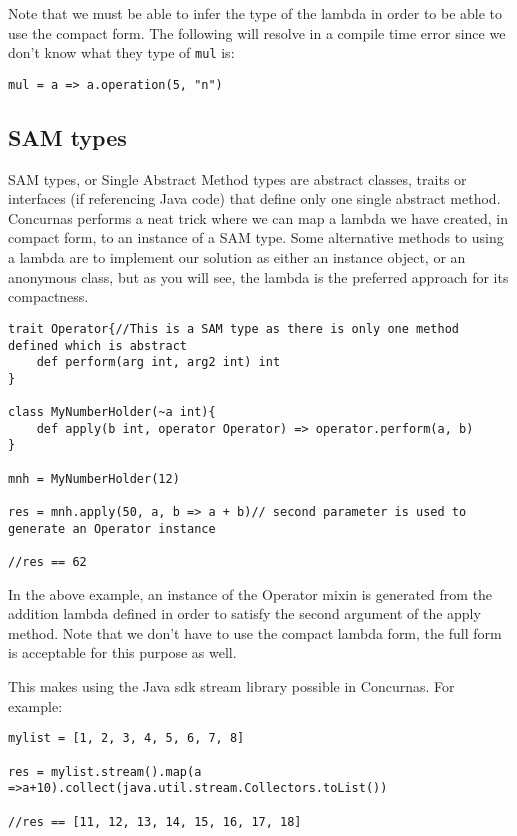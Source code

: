 \documentclass[conc-doc]{subfiles}
\begin{document}
Note that we must be able to infer the type of the lambda in order to be able to use the compact form. The following will resolve in a compile time error since we don't know what they type of \lstinline{mul} is:
\begin{lstlisting}
mul = a => a.operation(5, "n")
\end{lstlisting}

\subsection{SAM types}
\label{ss:samTypes}
SAM types, or Single Abstract Method types are abstract classes, traits or interfaces (if referencing Java code) that define only one single abstract method. Concurnas performs a neat trick where we can map a lambda we have created, in compact form, to an instance of a SAM type. Some alternative methods to using a lambda are to implement our solution as either an instance object, or an anonymous class, but as you will see, the lambda is the preferred approach for its compactness.

\begin{lstlisting}
trait Operator{//This is a SAM type as there is only one method defined which is abstract 
	def perform(arg int, arg2 int) int
}

class MyNumberHolder(~a int){
	def apply(b int, operator Operator) => operator.perform(a, b)
}

mnh = MyNumberHolder(12)

res = mnh.apply(50, a, b => a + b)// second parameter is used to generate an Operator instance

//res == 62
\end{lstlisting}

In the above example, an instance of the Operator mixin is generated from the addition lambda defined in order to satisfy the second argument of the apply method. Note that we don't have to use the compact lambda form, the full form is acceptable for this purpose as well.

This makes using the Java sdk stream library possible in Concurnas. For example:

\begin{lstlisting}
mylist = [1, 2, 3, 4, 5, 6, 7, 8]

res = mylist.stream().map(a =>a+10).collect(java.util.stream.Collectors.toList())

//res == [11, 12, 13, 14, 15, 16, 17, 18]
\end{lstlisting}
\end{document}
